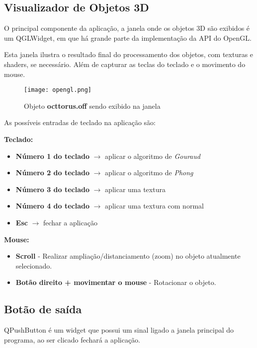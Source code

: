 \newpage

\subsection{Visualizador de Objetos 3D}

O principal componente da aplicação, a janela onde os objetos 3D 
são exibidos é um QGLWidget, em que há grande parte da implementação da 
API do OpenGL.

Esta janela ilustra o resultado final do processamento dos objetos, com texturas e shaders, se necessário.
Além de capturar as teclas do teclado e o movimento do mouse.


\begin{figure}[H]
    \centering
    \texttt{[image: opengl.png]}
    \caption{Objeto \textbf{octtorus.off} sendo exibido na janela}
\end{figure}

As possíveis entradas de teclado na aplicação são:

\textbf{Teclado:}

\begin{itemize}
    \item \textbf{Número 1 do teclado} $\rightarrow$ aplicar o algoritmo de \emph{Gouraud}
    \item \textbf{Número 2 do teclado} $\rightarrow$ aplicar o algoritmo de \emph{Phong}
    \item \textbf{Número 3 do teclado} $\rightarrow$ aplicar uma textura
    \item \textbf{Número 4 do teclado} $\rightarrow$ aplicar uma textura com normal
    \item \textbf{Esc} $\rightarrow$ fechar a aplicação
\end{itemize}

\textbf{Mouse:}

\begin{itemize}
    \item \textbf{Scroll} - Realizar ampliação/distanciamento (zoom) no objeto 
    atualmente selecionado. 
    \item \textbf{Botão direito + movimentar o mouse} - Rotacionar o objeto.
\end{itemize}

\subsection{Botão de saída}

QPushButton é um widget que possui um sinal ligado a janela principal do programa,
ao ser clicado fechará a aplicação.

